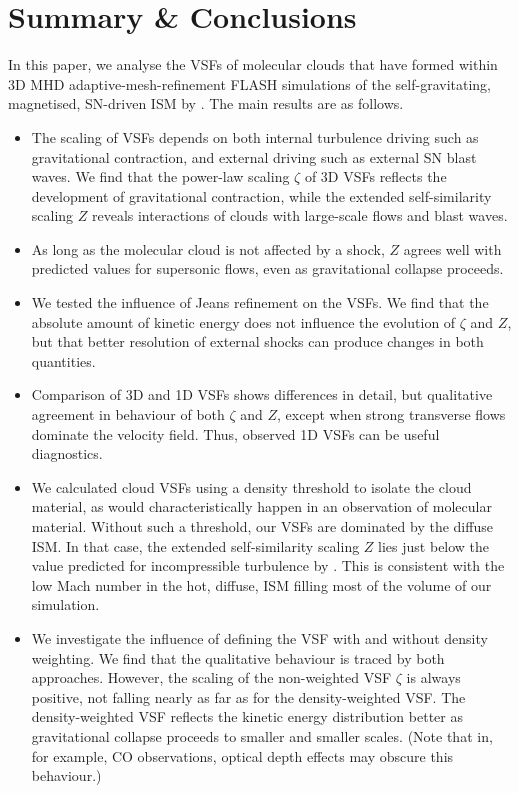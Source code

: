 \section{Summary \& Conclusions}\label{conclusions}

In this paper, we analyse the VSFs of molecular clouds that have formed within 3D MHD adaptive-mesh-refinement FLASH simulations of the self-gravitating, magnetised, SN-driven ISM by .
The main results are as follows.

\begin{itemize}
\item The scaling of VSFs depends on both internal turbulence driving such as gravitational contraction, and external driving such as external SN blast waves. We find that the power-law scaling $\zeta$ of 3D VSFs reflects the development of gravitational contraction, while the extended self-similarity scaling $Z$ reveals interactions of clouds with large-scale flows and blast waves.
\item As long as the molecular cloud is not affected by a shock, $Z$ agrees well with predicted values for supersonic flows, even as gravitational collapse proceeds.
\item We tested the influence of Jeans refinement on the VSFs. We find that the absolute amount of kinetic energy does not influence the evolution of $\zeta$ and $Z$, but that better resolution of external shocks can produce changes in both quantities.
\item Comparison of 3D and 1D VSFs shows differences in detail, but qualitative agreement in behaviour of both $\zeta$ and $Z$, except when strong transverse flows dominate the velocity field. Thus, observed 1D VSFs can be useful diagnostics. 
\item We calculated cloud VSFs using a density threshold to isolate the cloud material, as would characteristically happen in an observation of molecular material. Without such a threshold, our VSFs are dominated by the diffuse ISM. In that case, the extended self-similarity scaling $Z$ lies just below the value predicted for incompressible turbulence by \citet{She1994}. This is consistent with the low Mach number in the hot, diffuse, ISM filling most of the volume of our simulation.
\item We investigate the influence of defining the VSF with and without density weighting. We find that the qualitative behaviour is traced by both approaches. However, the scaling of the non-weighted VSF $\zeta$ is always positive, not falling nearly as far as for the density-weighted VSF. The density-weighted VSF reflects the kinetic energy distribution better as gravitational collapse proceeds to smaller and smaller scales. (Note that in, for example, CO observations, optical depth effects may obscure this behaviour.) 

\end{itemize}
